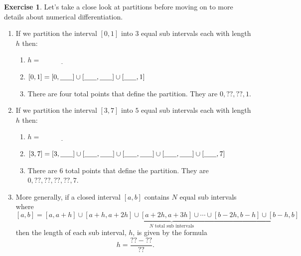 \documentclass[
]{book}
\providecommand{\tightlist}{%
  \setlength{\itemsep}{0pt}\setlength{\parskip}{0pt}}
\theoremstyle{definition}
\theoremstyle{definition}
\theoremstyle{definition}
\newtheorem{exercise}{Exercise}[chapter]
\theoremstyle{remark}
\begin{document}
\begin{exercise}
\protect\hypertarget{exr:unnamed-chunk-138}{}{\label{exr:unnamed-chunk-138} }Let's take a close look at partitions before moving on to more details about numerical differentiation.

\begin{enumerate}
\def\labelenumi{\alph{enumi}.}
\tightlist
\item
  If we partition the interval \([0,1]\) into \(3\) equal sub intervals each with length \(h\) then:

  \begin{enumerate}
  \def\labelenumii{\roman{enumii}.}
  \tightlist
  \item
    \(h = \underline{\hspace{1in}}\)
  \item
    \([0,1] = [0,\underline{\hspace{0.25in}}] \cup [\underline{\hspace{0.25in}},\underline{\hspace{0.25in}}] \cup [\underline{\hspace{0.25in}},1]\)
  \item
    There are four total points that define the partition. They are \(0, ??, ??, 1\).
  \end{enumerate}
\item
  If we partition the interval \([3,7]\) into \(5\) equal sub intervals each with length \(h\) then:

  \begin{enumerate}
  \def\labelenumii{\roman{enumii}.}
  \tightlist
  \item
    \(h = \underline{\hspace{1in}}\)
  \item
    \([3,7] = [3,\underline{\hspace{0.25in}}] \cup [\underline{\hspace{0.25in}},\underline{\hspace{0.25in}}] \cup [\underline{\hspace{0.25in}},\underline{\hspace{0.25in}}] \cup [\underline{\hspace{0.25in}},\underline{\hspace{0.25in}}] \cup [\underline{\hspace{0.25in}},7]\)
  \item
    There are 6 total points that define the partition. They are \(0, ??, ??, ??, ??, 7\).
  \end{enumerate}
\item
  More generally, if a closed interval \([a,b]\) contains \(N\) equal sub intervals where
  \[ [a,b] = \underbrace{[a,a+h] \cup [a+h, a+2h] \cup [a+2h, a+3h] \cup \cdots \cup [b-2h,b-h] \cup [b-h,b]}_{\text{$N$ total sub intervals}} \]
  then the length of each sub interval, \(h\), is given by the formula
  \[ h = \frac{?? - ??}{??}. \]
\end{enumerate}
\end{exercise}
\end{document}
